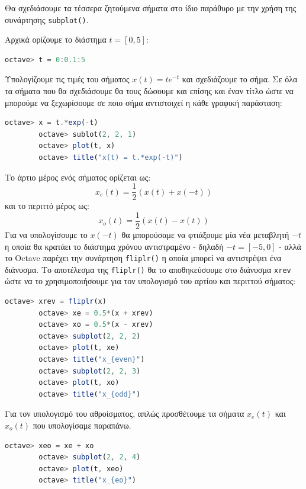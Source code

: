 \documentclass{article}
\begin{document}
Θα σχεδιάσουμε τα τέσσερα ζητούμενα σήματα στο ίδιο παράθυρο με την
χρήση της συνάρτησης \lstinline{subplot()}.

Αρχικά ορίζουμε το διάστημα $t = [0, 5]$:
\begin{lstlisting}[language=octave]
        octave> t = 0:0.1:5
\end{lstlisting}

Υπολογίζουμε τις τιμές του σήματος $x(t) = te^{-t}$ και σχεδιάζουμε το σήμα.
Σε όλα τα σήματα που θα σχεδιάσουμε θα τους δώσουμε και επίσης και έναν τίτλο
ώστε να μπορούμε να ξεχωρίσουμε σε ποιο σήμα αντιστοιχεί η κάθε γραφική
παράσταση:
\begin{lstlisting}[language=octave]
        octave> x = t.*exp(-t)
        octave> sublot(2, 2, 1)
        octave> plot(t, x)
        octave> title("x(t) = t.*exp(-t)")
\end{lstlisting}

Το άρτιο μέρος ενός σήματος ορίζεται ως:
\[x_e(t) = \frac{1}{2}(x(t) + x(-t))\]
και το περιττό μέρος ως:
\[x_o(t) = \frac{1}{2}(x(t) - x(t))\]
Για να υπολογίσουμε το $x(-t)$ θα μπορούσαμε να φτιάξουμε μία νέα μεταβλητή
$-t$ η οποία θα κρατάει το διάστημα χρόνου αντιστραμένο - δηλαδή
$-t = [-5, 0]$ - αλλά το Octave παρέχει την συνάρτηση \lstinline{fliplr()}
η οποία μπορεί να αντιστρέψει ένα διάνυσμα. Το αποτέλεσμα της
\lstinline{fliplr()} θα το αποθηκεύσουμε στο διάνυσμα \lstinline{xrev}
ώστε να το χρησιμοποιήσουμε για τον υπολογισμό του αρτίου και περιττού
σήματος:
\begin{lstlisting}[language=octave]
        octave> xrev = fliplr(x)
        octave> xe = 0.5*(x + xrev)
        octave> xo = 0.5*(x - xrev)
        octave> subplot(2, 2, 2)
        octave> plot(t, xe)
        octave> title("x_{even}")
        octave> subplot(2, 2, 3)
        octave> plot(t, xo)
        octave> title("x_{odd}")
\end{lstlisting}

Για τον υπολογισμό του αθροίσματος, απλώς προσθέτουμε τα σήματα
$x_e(t)$ και $x_o(t)$ που υπολογίσαμε παραπάνω.
\begin{lstlisting}[language=octave]
        octave> xeo = xe + xo
        octave> subplot(2, 2, 4)
        octave> plot(t, xeo)
        octave> title("x_{eo}")
\end{lstlisting}
\end{document}
